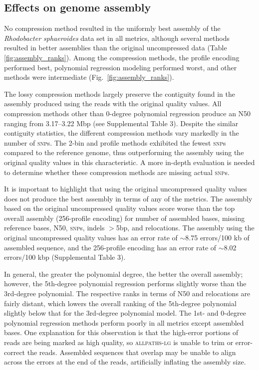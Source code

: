 \documentclass{bioinfo}
\begin{document}
\subsection{Effects on genome assembly}

No compression method resulted in the uniformly best assembly of the
\textit{Rhodobacter sphaeroides} data set in all metrics, although
several methods resulted in better assemblies than the original
uncompressed data (Table \ref{fig:assembly_ranks}). Among the
compression methods, the profile encoding performed best, polynomial
regression modeling performed worst, and other methods were
intermediate (Fig.~\ref{fig:assembly_ranks}).

The lossy compression methods largely preserve the contiguity found in
the assembly produced using the reads with the original quality
values. All compression methods other than 0-degree polynomial
regression produce an N50 ranging from 3.17--3.22 Mbp (see
Supplemental Table 3). Despite the similar contiguity statistics, the
different compression methods vary markedly in the number of
\textsc{snp}s. The 2-bin and profile methods exhibited the fewest
\textsc{snp}s compared to the reference genome, thus outperforming the
assembly using the original quality values in this characteristic. A
more in-depth evaluation is needed to determine whether these
compression methods are missing actual \textsc{snp}s.

It is important to highlight that using the original uncompressed
quality values does not produce the best assembly in terms of any of
the metrics. The assembly based on the original uncompressed quality
values score worse than the top overall assembly (256-profile
encoding) for number of assembled bases, missing reference bases, N50,
\textsc{snp}s, indels $>$5bp, and relocations. The assembly using the
original uncompressed quality values has an error rate of $\sim$8.75
errors/100 kb of assembled sequence, and the 256-profile encoding has
an error rate of $\sim$8.02 errors/100 kbp (Supplemental Table 3).

In general, the greater the polynomial degree, the better the overall
assembly; however, the 5th-degree polynomial regression performs
slightly worse than the 3rd-degree polynomial. The respective ranks in
terms of N50 and relocations are fairly distant, which lowers the
overall ranking of the 5th-degree polynomial slightly below that for
the 3rd-degree polynomial model. The 1st- and 0-degree polynomial
regression methods perform poorly in all metrics except assembled
bases. One explanation for this observation is that the high-error
portions of reads are being marked as high quality, so
\textsc{allpaths-lg} is unable to trim or error-correct the
reads. Assembled sequences that overlap may be unable to align across
the errors at the end of the reads, artificially inflating the
assembly size.
\end{document}
